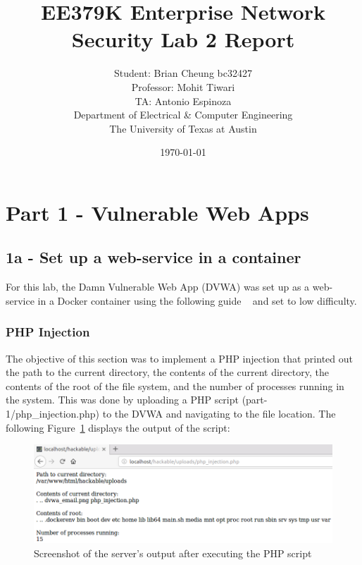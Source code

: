 \documentclass[11pt]{article}
\author{Student: Brian Cheung bc32427 \\ Professor: Mohit Tiwari \\ TA: Antonio Espinoza \\ Department of Electrical \& Computer Engineering \\ The University of Texas at Austin}
\date{\today}
\title{EE379K Enterprise Network Security Lab 2 Report}
\begin{document}
\maketitle
\newpage
\section*{Part 1 - Vulnerable Web Apps}
\label{sec:part-1}
\subsection*{1a - Set up a web-service in a container}
For this lab, the Damn Vulnerable Web App (DVWA) was set up as a web-service in a Docker container
using the following guide ~\cite{dvwa} and set to low difficulty.

\subsubsection*{PHP Injection}
The objective of this section was to implement a PHP injection that printed out the path to the current directory,
the contents of the current directory, the contents of the root of the file system, and the number of processes running in the system.
This was done by uploading a PHP script (part-1/php\_injection.php) to the DVWA and navigating to the file location.
The following Figure~\ref{fig:php-injection} displays the output of the script:
\begin{figure}[htbp]
  \centering
  \includegraphics[width=.9\linewidth]{./php-injection.png}
  \caption{\label{fig:php-injection}
  Screenshot of the server's output after executing the PHP script}
\end{figure}
\end{document}
